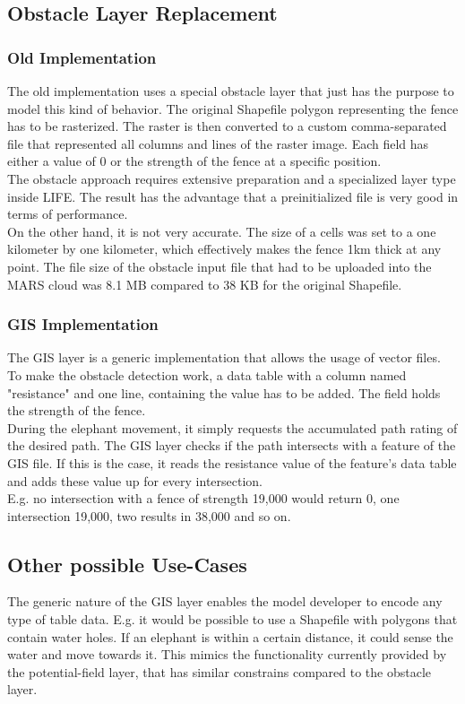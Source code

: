 \subsection{Obstacle Layer Replacement}

\subsubsection{Old Implementation}
The old implementation uses a special obstacle layer that just has the purpose to model this kind of behavior. The original Shapefile polygon representing the fence has to be rasterized. The raster is then converted to a custom comma-separated file that represented all columns and lines of the raster image. Each field has either a value of 0 or the strength of the fence at a specific position.\\
The obstacle approach requires extensive preparation and a specialized layer type inside LIFE. The result has the advantage that a preinitialized file is very good in terms of performance.\\
On the other hand, it is not very accurate. The size of a cells was set to a one kilometer by one kilometer, which effectively makes the fence 1km thick at any point. The file size of the obstacle input file that had to be uploaded into the MARS cloud was 8.1 MB compared to 38 KB for the original Shapefile.

\subsubsection{GIS  Implementation}
The GIS layer is a generic implementation that allows the usage of vector files. To make the obstacle detection work, a data table with a column named "resistance" and one line, containing the value has to be added. The field holds the strength of the fence.\\
During the elephant movement, it simply requests the accumulated path rating of the desired path. The GIS layer checks if the path intersects with a feature of the GIS file. If this is the case, it reads the resistance value of the feature's data table and adds these value up for every intersection.\\
E.g. no intersection with a fence of strength 19,000 would return 0, one intersection 19,000, two results in 38,000 and so on.\\


\subsection{Other possible Use-Cases}
The generic nature of the GIS layer enables the model developer to encode any type of table data. E.g. it would be possible to use a Shapefile with polygons that contain water holes. If an elephant is within a certain distance, it could sense the water and move towards it. This mimics the functionality currently provided by the potential-field layer, that has similar constrains compared to the obstacle layer.
